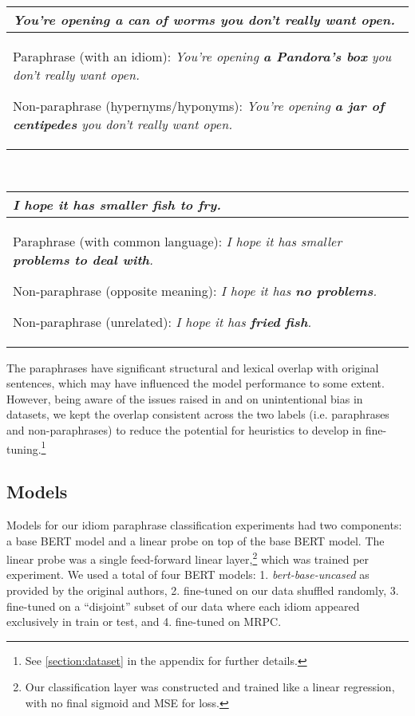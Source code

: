 \documentclass[11pt,a4paper]{article}
\begin{document}
\vspace{2mm}
\begin{small}
\noindent\begin{tabular}{|p{\linewidth}|}
\hline
\textit{You're opening \textbf{a can of worms} you don't really want open.} \\\hline
Paraphrase (with an idiom): \textit{You're opening \textbf{a Pandora’s box} you don't really want open.}

\vspace{1mm}
Non-paraphrase (hypernyms/hyponyms): \textit{You're opening \textbf{a jar of centipedes} you don't really want open.}
\\\hline
\end{tabular}\\

\vspace{2mm}


\noindent\begin{tabular}{|p{\linewidth}|}
\hline \textit{I hope it has smaller \textbf{fish to fry}.} \\\hline
Paraphrase (with common language): \textit{I hope it has smaller \textbf{problems to deal with}.}

\vspace{1mm}
Non-paraphrase (opposite meaning): \textit{I hope it has \textbf{no problems}.} 

\vspace{1mm}
Non-paraphrase (unrelated): \textit{I hope it has \textbf{fried fish}.} \\\hline
\end{tabular}
\end{small}

The paraphrases have significant structural and lexical overlap with original sentences, which may have influenced the model performance to some extent. However, being aware of the issues raised in \citet{niven2019probing} and \citet{mccoy2019right} on unintentional bias in datasets, we kept the overlap consistent across the two labels (i.e. paraphrases and non-paraphrases) to reduce the potential for heuristics to develop in fine-tuning.\footnote{See \ref{section:dataset} in the appendix for further details.}

\subsection{Models}

Models for our idiom paraphrase classification experiments had two components: a base BERT model and a linear probe on top of the base BERT model. The linear probe was a single feed-forward linear layer,\footnote{\label{probe-wrong-note}Our classification layer was constructed and trained like a linear regression, with no final sigmoid and MSE for loss.} which was trained per experiment. We used a total of four BERT models: 1. \textit{bert-base-uncased}  as provided by the original authors, 2. fine-tuned on our data shuffled randomly, 3. fine-tuned on a ``disjoint'' subset of our data where each idiom appeared exclusively in train or test, and 4. fine-tuned on MRPC.
\end{document}
